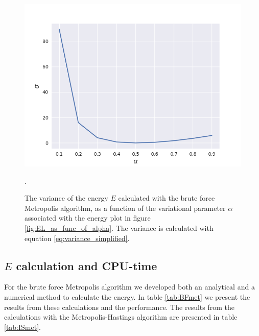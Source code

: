 \documentclass[norsk,a4paper,12pt]{article}
\begin{document}
\begin{figure} [H]
	\centering
	\includegraphics[scale=0.6]{images/variance.png}
	\caption{The variance of the energy $E$ calculated with the brute force Metropolis algorithm, as a function of the variational parameter $\alpha$ associated with the energy plot in figure \ref{fig:EL_as_func_of_alpha}. The variance is calculated with equation \ref{eq:variance_simplified}.}.
	\label{fig:variance_EL_as_func_of_alpha}
\end{figure} 

\subsection{$E$ calculation and CPU-time}\label{CPU}
For the brute force Metropolis algorithm we developed both an analytical and a numerical method to calculate the energy. In table \ref{tab:BFmet} we present the results from these calculations and the performance. The results from the calculations with the Metropolis-Hastings algorithm are presented in table \ref{tab:ISmet}.
\end{document}
